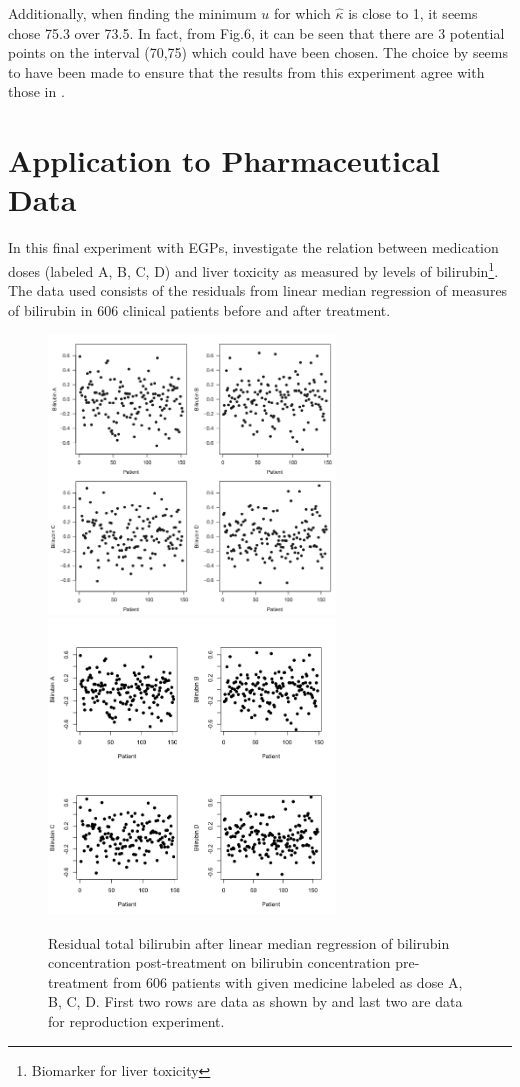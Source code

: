 \documentclass[12pt]{article}
\theoremstyle{definition}
\theoremstyle{definition}
\begin{document}
Additionally, when finding the minimum $u$ for which $\hat \kappa$ is close to 1, it seems \cite{papatawn} chose 75.3 over 73.5. In fact, from Fig.6, it can be seen that there are 3 potential points on the interval (70,75) which could have been chosen. The choice by \cite{papatawn} seems to have been made to ensure that the results from this experiment agree with those in \cite{fig5}.

\section{Application to Pharmaceutical Data}
In this final experiment with EGPs, \cite{papatawn} investigate the relation between medication doses (labeled A, B, C, D) and liver toxicity as measured by levels of bilirubin\footnote{Biomarker for liver toxicity}. The data used consists of the residuals from linear median regression of measures of bilirubin in 606 clinical patients before and after treatment.
\begin{figure}[H]
\begin{center}
{\includegraphics[width=3in]{project/papafiles/fig1.papa.png}}
{\includegraphics[width=3in]{project/papafiles/fig1.me.png}}
\caption{Residual total bilirubin after linear median regression of bilirubin concentration post-treatment on bilirubin concentration pre-treatment  from 606 patients with given medicine labeled as dose A, B, C, D. First two rows are data as shown by \cite{papatawn} and last two are data for reproduction experiment.}
\end{center}
\end{figure}
\end{document}
